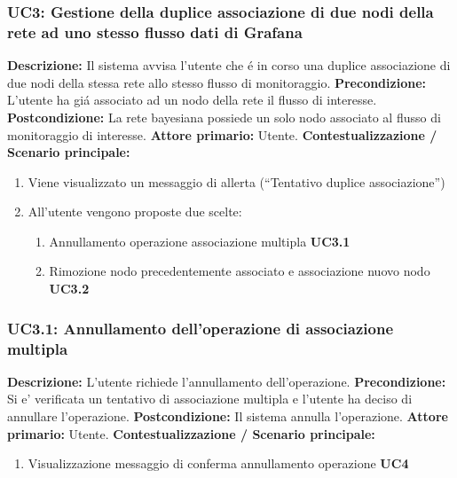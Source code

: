                 \subsubsection{UC3: Gestione della duplice associazione di due nodi della rete ad uno stesso flusso dati di Grafana}
                    \textbf{Descrizione:} Il sistema avvisa l’utente che é in corso una duplice associazione di due nodi della stessa rete allo stesso flusso di monitoraggio.
                    \newline
                    \textbf{Precondizione:} L’utente ha giá associato ad un nodo della rete il flusso di interesse.
                    \newline
                    \textbf{Postcondizione:}  La rete bayesiana possiede un solo nodo associato al flusso di monitoraggio di interesse.
                    \newline
                    \textbf{Attore primario:} Utente.
                    \newline
                    \textbf{Contestualizzazione / Scenario principale:} \begin{enumerate}
                        \item Viene visualizzato un messaggio di allerta (“Tentativo duplice associazione”)
                        \item All’utente vengono proposte due scelte:
                                \begin{enumerate}
                                    \item Annullamento operazione associazione multipla \textbf{UC3.1}
                                    \item Rimozione nodo precedentemente associato e associazione nuovo nodo \textbf{UC3.2}
                                \end{enumerate}
                    \end{enumerate}
                
                \subsubsection{UC3.1: Annullamento dell'operazione di associazione multipla}
                    \textbf{Descrizione:}  L’utente richiede l’annullamento dell’operazione.
                    \newline
                    \textbf{Precondizione:} Si e’ verificata un tentativo di associazione multipla e l’utente ha deciso di annullare l’operazione.
                    \newline
                    \textbf{Postcondizione:}  Il sistema annulla l’operazione.
                    \newline
                    \textbf{Attore primario:} Utente.
                    \newline
                    \textbf{Contestualizzazione / Scenario principale:} \begin{enumerate}
                        \item Visualizzazione messaggio di conferma annullamento operazione \textbf{UC4}
                    \end{enumerate}
                
